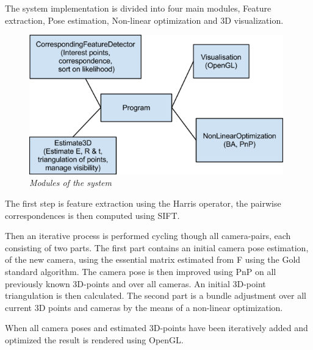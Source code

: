 The system implementation is divided into four main modules, Feature extraction, Pose estimation, Non-linear optimization and 3D visualization.

\begin{figure}[htb]
	\centering
	\includegraphics[width=110mm]{images/system_modules.png}
	\caption{\textit{Modules of the system}}
	\label{fig:block_overview2_fig}  %
\end{figure}

The first step is feature extraction using the Harris operator, the pairwise correspondences is then computed using SIFT.

Then an iterative process is performed cycling though all camera-pairs, each consisting of two parts. The first part contains an initial camera pose estimation, of the new camera, using the essential matrix estimated from F using the Gold standard algorithm. The camera pose is then improved using PnP on all previously known 3D-points and over all cameras. An initial 3D-point triangulation is then calculated.
The second part is a bundle adjustment over all current 3D points and cameras by the means of a non-linear optimization.

When all camera poses and estimated 3D-points have been iteratively added and optimized the result is rendered using OpenGL.